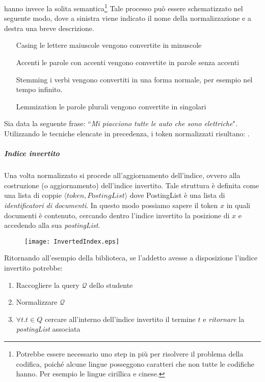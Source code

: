 hanno invece la solita semantica\footnote{Potrebbe essere necessario uno step in più per risolvere il problema della codifica, poiché alcune lingue posseggono caratteri che non tutte le codifiche hanno. Per esempio le
	lingue cirillica e cinese.}
Tale processo può essere schematizzato nel seguente modo, dove a sinistra viene indicato
il nome della normalizzazione e a destra una breve descrizione.
\begin{itemize}
	\item[Casing] le lettere maiuscole vengono convertite in minuscole
	\item[Accenti] le parole con accenti vengono convertite in parole senza accenti
	\item[Stemming] i verbi vengono convertiti in una forma normale, per esempio nel tempo infinito.
	\item[Lemmization] le parole plurali vengono convertite in singolari
\end{itemize}

\begin{esempio}[normalization]
	Sia data la seguente frase: ``\textit{Mi piacciono tutte le auto che sono elettriche}".
	Utilizzando le tecniche elencate in precedenza, i token normalizzati risultano:
	    
	  .
\end{esempio}

\subparagraph{Indice invertito}
Una volta normalizzato si procede all'aggiornamento dell'indice, ovvero alla costruzione (o aggiornamento)
dell'indice invertito. Tale struttura è definita come una lista di coppie
$\langle token, PostingList \rangle$ dove PostingList è una lista di \textit{identificatori di documenti}.
In questo modo possiamo sapere il token $x$ in quali documenti è contenuto, cercando dentro l'indice
invertito la posizione di $x$ e accedendo alla sua \textit{postingList}.

\begin{figure}[h]
	\label{fig:invertedIndex}
	\centering
	\texttt{[image: InvertedIndex.eps]}
\end{figure}

Ritornando all'esempio della biblioteca, se l'addetto avesse a disposizione l'indice invertito potrebbe:
\begin{enumerate}
	\item Raccogliere la query $\mathcal{Q}$ dello studente
	\item Normalizzare $\mathcal{Q}$
	\item $\forall t.t\in Q$ cercare all'interno dell'indice invertito il termine $t$ e \textit{ritornare} la \textit{postingList} associata
\end{enumerate}

